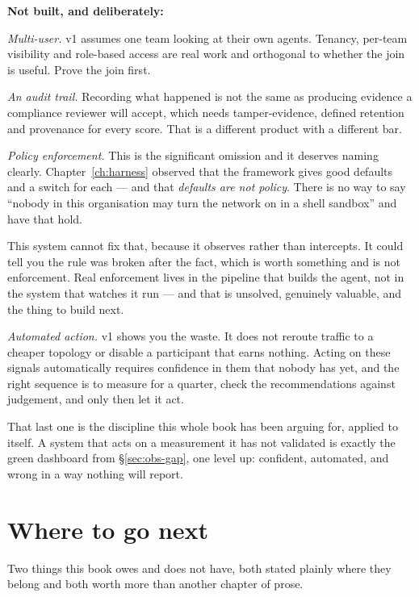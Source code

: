 \textbf{Not built, and deliberately:}

\emph{Multi-user.} v1 assumes one team looking at their own agents. Tenancy,
per-team visibility and role-based access are real work and orthogonal to whether
the join is useful. Prove the join first.

\emph{An audit trail.} Recording what happened is not the same as producing
evidence a compliance reviewer will accept, which needs tamper-evidence, defined
retention and provenance for every score. That is a different product with a
different bar.

\emph{Policy enforcement.} This is the significant omission and it deserves
naming clearly. Chapter~\ref{ch:harness} observed that the framework gives good
defaults and a switch for each --- and that \emph{defaults are not policy}. There
is no way to say ``nobody in this organisation may turn the network on in a
shell sandbox'' and have that hold.

This system cannot fix that, because it observes rather than intercepts. It could
tell you the rule was broken after the fact, which is worth something and is not
enforcement. Real enforcement lives in the pipeline that builds the agent, not in
the system that watches it run --- and that is unsolved, genuinely valuable, and
the thing to build next.

\emph{Automated action.} v1 shows you the waste. It does not reroute traffic to a
cheaper topology or disable a participant that earns nothing. Acting on these
signals automatically requires confidence in them that nobody has yet, and the
right sequence is to measure for a quarter, check the recommendations against
judgement, and only then let it act.

\begin{note}
That last one is the discipline this whole book has been arguing for, applied to
itself. A system that acts on a measurement it has not validated is exactly the
green dashboard from \S\ref{sec:obs-gap}, one level up: confident, automated, and
wrong in a way nothing will report.
\end{note}

\section{Where to go next}
\label{sec:cap-next}

Two things this book owes and does not have, both stated plainly where they
belong and both worth more than another chapter of prose.

